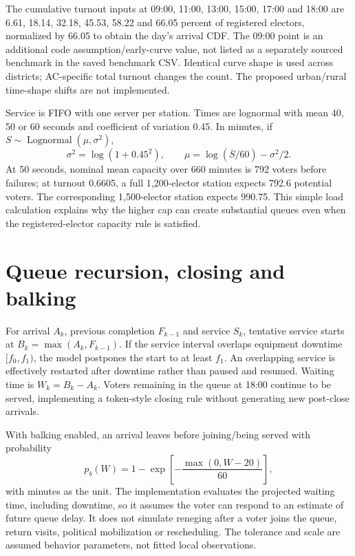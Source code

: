 \documentclass[11pt,a4paper,oneside]{report}
\newcommand{\source}[1]{\par\nopagebreak[4]{\footnotesize\color{teal}Evidence: #1.}\par}
\begin{document}
The cumulative turnout inputs at 09:00, 11:00, 13:00, 15:00, 17:00 and 18:00 are 6.61, 18.14, 32.18, 45.53, 58.22 and 66.05 percent of registered electors, normalized by 66.05 to obtain the day's arrival CDF. The 09:00 point is an additional code assumption/early-curve value, not listed as a separately sourced benchmark in the saved benchmark CSV. Identical curve shape is used across districts; AC-specific total turnout changes the count. The proposed urban/rural time-shape shifts are not implemented.

Service is FIFO with one server per station. Times are lognormal with mean 40, 50 or 60 seconds and coefficient of variation 0.45. In minutes, if $S\sim\operatorname{Lognormal}(\mu,\sigma^2)$,
\begin{equation}\sigma^2=\log(1+0.45^2),\qquad\mu=\log(\overline S/60)-\sigma^2/2.
\end{equation}
At 50 seconds, nominal mean capacity over 660 minutes is 792 voters before failures; at turnout 0.6605, a full 1,200-elector station expects 792.6 potential voters. The corresponding 1,500-elector station expects 990.75. This simple load calculation explains why the higher cap can create substantial queues even when the registered-elector capacity rule is satisfied.
\source{[S11]}

\section{Queue recursion, closing and balking}
For arrival $A_k$, previous completion $F_{k-1}$ and service $S_k$, tentative service starts at $B_k=\max(A_k,F_{k-1})$. If the service interval overlaps equipment downtime $[f_0,f_1)$, the model postpones the start to at least $f_1$. An overlapping service is effectively restarted after downtime rather than paused and resumed. Waiting time is $W_k=B_k-A_k$. Voters remaining in the queue at 18:00 continue to be served, implementing a token-style closing rule without generating new post-close arrivals.

With balking enabled, an arrival leaves before joining/being served with probability
\begin{equation}
 p_b(W)=1-\exp\left[-\frac{\max(0,W-20)}{60}\right],
\end{equation}
with minutes as the unit. The implementation evaluates the projected waiting time, including downtime, so it assumes the voter can respond to an estimate of future queue delay. It does not simulate reneging after a voter joins the queue, return visits, political mobilization or rescheduling. The tolerance and scale are assumed behavior parameters, not fitted local observations.
\end{document}
